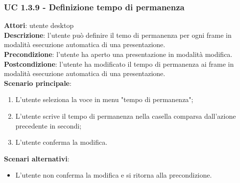 \subsubsection{UC 1.3.9 - Definizione tempo di permanenza}{
	\label{uc1.3.9}
	\textbf{Attori}: utente desktop \\
	\textbf{Descrizione}: l'utente può definire il temo di permanenza per ogni frame in modalità esecuzione automatica di una presentazione. \\
	\textbf{Precondizione}: l'utente ha aperto una presentazione in modalità modifica.	\\
	\textbf{Postcondizione}: l'utente ha modificato il tempo di permanenza ai frame in modalità esecuzione automatica di una presentazione.	\\
	\textbf{Scenario principale}:
	\begin{enumerate}
		\item L'utente seleziona la voce in menu "tempo di permanenza";
		\item L'utente scrive il tempo di permanenza nella casella comparsa dall'azione precedente in secondi;
		\item L'utente conferma la modifica.
	\end{enumerate}
	\textbf{Scenari alternativi}:
	\begin{itemize}
		\item L'utente non conferma la modifica  e si ritorna alla precondizione.
	\end{itemize}
}
